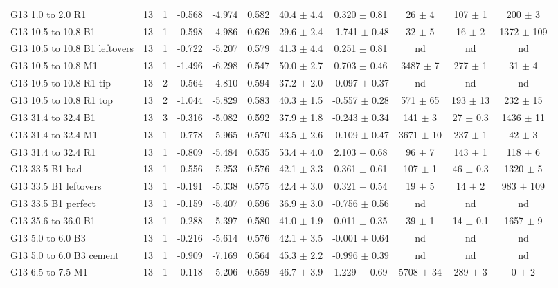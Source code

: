 \documentclass{article}
\begin{document}
\begin{sidewaystable}[htbp]
\begin{tabular}{ | l | c | c | c | c | c | c | c | c | c | c | }
G13 1.0 to 2.0 R1 & 13 & 1 & -0.568 & -4.974 & 0.582 & 40.4 $\pm$ 4.4 & 0.320 $\pm$ 0.81 & 26 $\pm$ 4 & 107 $\pm$ 1 & 200 $\pm$ 3 \\
G13 10.5 to 10.8 B1 & 13 & 1 & -0.598 & -4.986 & 0.626 & 29.6 $\pm$ 2.4 & -1.741 $\pm$ 0.48 & 32 $\pm$ 5 & 16 $\pm$ 2 & 1372 $\pm$ 109 \\
G13 10.5 to 10.8 B1 leftovers & 13 & 1 & -0.722 & -5.207 & 0.579 & 41.3 $\pm$ 4.4 & 0.251 $\pm$ 0.81 &  nd  &  nd  &  nd  \\
G13 10.5 to 10.8 M1 & 13 & 1 & -1.496 & -6.298 & 0.547 & 50.0 $\pm$ 2.7 & 0.703 $\pm$ 0.46 & 3487 $\pm$ 7 & 277 $\pm$ 1 & 31 $\pm$ 4 \\
G13 10.5 to 10.8 R1 tip & 13 & 2 & -0.564 & -4.810 & 0.594 & 37.2 $\pm$ 2.0 & -0.097 $\pm$ 0.37 &  nd  &  nd  &  nd  \\
G13 10.5 to 10.8 R1 top & 13 & 2 & -1.044 & -5.829 & 0.583 & 40.3 $\pm$ 1.5 & -0.557 $\pm$ 0.28 & 571 $\pm$ 65 & 193 $\pm$ 13 & 232 $\pm$ 15 \\
G13 31.4 to 32.4 B1 & 13 & 3 & -0.316 & -5.082 & 0.592 & 37.9 $\pm$ 1.8 & -0.243 $\pm$ 0.34 & 141 $\pm$ 3 & 27 $\pm$ 0.3 & 1436 $\pm$ 11 \\
G13 31.4 to 32.4 M1 & 13 & 1 & -0.778 & -5.965 & 0.570 & 43.5 $\pm$ 2.6 & -0.109 $\pm$ 0.47 & 3671 $\pm$ 10 & 237 $\pm$ 1 & 42 $\pm$ 3 \\
G13 31.4 to 32.4 R1 & 13 & 1 & -0.809 & -5.484 & 0.535 & 53.4 $\pm$ 4.0 & 2.103 $\pm$ 0.68 & 96 $\pm$ 7 & 143 $\pm$ 1 & 118 $\pm$ 6 \\
G13 33.5 B1 bad & 13 & 1 & -0.556 & -5.253 & 0.576 & 42.1 $\pm$ 3.3 & 0.361 $\pm$ 0.61 & 107 $\pm$ 1 & 46 $\pm$ 0.3 & 1320 $\pm$ 5 \\
G13 33.5 B1 leftovers & 13 & 1 & -0.191 & -5.338 & 0.575 & 42.4 $\pm$ 3.0 & 0.321 $\pm$ 0.54 & 19 $\pm$ 5 & 14 $\pm$ 2 & 983 $\pm$ 109 \\
G13 33.5 B1 perfect & 13 & 1 & -0.159 & -5.407 & 0.596 & 36.9 $\pm$ 3.0 & -0.756 $\pm$ 0.56 &  nd  &  nd  &  nd  \\
G13 35.6 to 36.0 B1 & 13 & 1 & -0.288 & -5.397 & 0.580 & 41.0 $\pm$ 1.9 & 0.011 $\pm$ 0.35 & 39 $\pm$ 1 & 14 $\pm$ 0.1 & 1657 $\pm$ 9 \\
G13 5.0 to 6.0 B3 & 13 & 1 & -0.216 & -5.614 & 0.576 & 42.1 $\pm$ 3.5 & -0.001 $\pm$ 0.64 &  nd  &  nd  &  nd  \\
G13 5.0 to 6.0 B3 cement & 13 & 1 & -0.909 & -7.169 & 0.564 & 45.3 $\pm$ 2.2 & -0.996 $\pm$ 0.39 &  nd  &  nd  &  nd  \\
G13 6.5 to 7.5 M1 & 13 & 1 & -0.118 & -5.206 & 0.559 & 46.7 $\pm$ 3.9 & 1.229 $\pm$ 0.69 & 5708 $\pm$ 34 & 289 $\pm$ 3 & 0 $\pm$ 2 \\

\end{tabular}
\end{sidewaystable}
\end{document}
